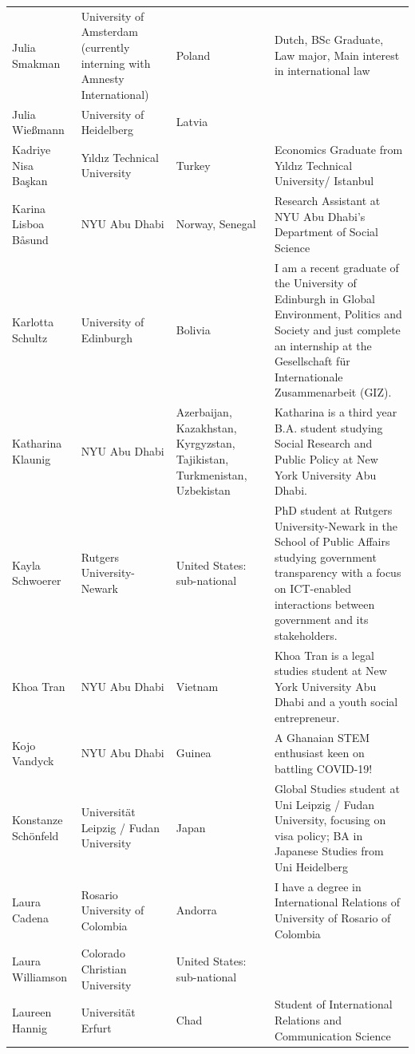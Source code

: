 \documentclass[
]{article}
\begin{document}
\begin{longtable}[t]{l>{\raggedright\arraybackslash}p{2cm}>{\raggedright\arraybackslash}p{2cm}>{\raggedright\arraybackslash}p{3cm}}
\addlinespace
Julia Smakman & University of Amsterdam (currently interning with Amnesty International) & Poland & Dutch, BSc Graduate, Law major, Main interest in international law\\
\rowcolor{gray!6}  Julia Wießmann & University of Heidelberg & Latvia & \\
Kadriye Nisa Başkan & Yıldız Technical University & Turkey & Economics Graduate from Yıldız Technical University/ Istanbul\\
\rowcolor{gray!6}  Karina Lisboa Båsund & NYU Abu Dhabi & Norway, Senegal & Research Assistant at NYU Abu Dhabi's Department of Social Science\\
Karlotta Schultz & University of Edinburgh & Bolivia & I am a recent graduate of the University of Edinburgh in Global Environment, Politics and Society and just complete an internship at the Gesellschaft für Internationale Zusammenarbeit (GIZ).\\
\addlinespace
\rowcolor{gray!6}  Katharina Klaunig & NYU Abu Dhabi & Azerbaijan, Kazakhstan, Kyrgyzstan, Tajikistan, Turkmenistan, Uzbekistan & Katharina is a third year B.A. student studying Social Research and Public Policy at New York University Abu Dhabi.\\
Kayla Schwoerer & Rutgers University-Newark & United States: sub-national & PhD student at Rutgers University-Newark in the School of Public Affairs studying government transparency with a focus on ICT-enabled interactions between government and its stakeholders.\\
\rowcolor{gray!6}  Khoa Tran & NYU Abu Dhabi & Vietnam & Khoa Tran is a legal studies student at New York University Abu Dhabi and a youth social entrepreneur.\\
Kojo Vandyck & NYU Abu Dhabi & Guinea & A Ghanaian STEM enthusiast keen on battling COVID-19!\\
\rowcolor{gray!6}  Konstanze Schönfeld & Universität Leipzig / Fudan University & Japan & Global Studies student at Uni Leipzig / Fudan University, focusing on visa policy; BA in Japanese Studies from Uni Heidelberg\\
\addlinespace
Laura Cadena & Rosario University of Colombia & Andorra & I have a degree in International Relations of University of Rosario of Colombia\\
\rowcolor{gray!6}  Laura Williamson & Colorado Christian University & United States: sub-national & \\
Laureen Hannig & Universität Erfurt & Chad & Student of International Relations and Communication Science\\

\end{longtable}
\end{document}
